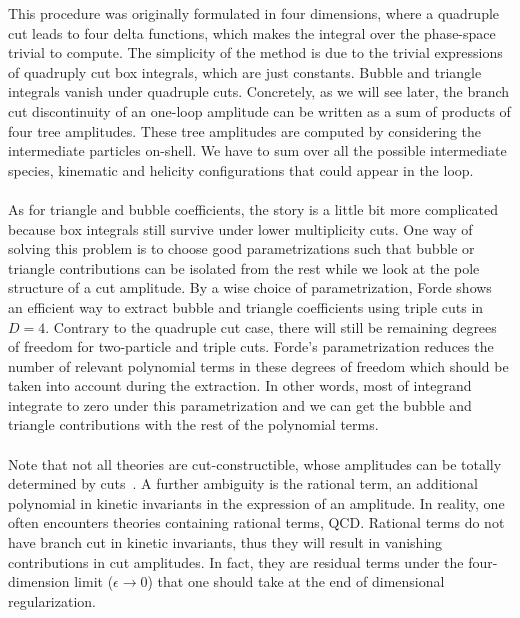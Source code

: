 This procedure was originally formulated in four dimensions, where a quadruple cut leads to four delta functions, which makes the integral over the phase-space trivial to compute. 
The simplicity of the method is due to the trivial expressions of quadruply cut box integrals, which are just constants.
Bubble and triangle integrals vanish under quadruple cuts.
Concretely, as we will see later, the branch cut discontinuity of an one-loop amplitude can be written as a sum of products of four tree amplitudes.
These tree amplitudes are computed by considering the intermediate particles on-shell.
We have to sum over all the possible intermediate species, kinematic and helicity configurations that could appear in the loop.
\\\\
As for triangle and bubble coefficients, the story is a little bit more complicated because box integrals still survive under lower multiplicity cuts.
One way of solving this problem is to choose good parametrizations such that bubble or triangle contributions can be isolated from the rest while we look at the pole structure of a cut amplitude.
By a wise choice of parametrization, Forde shows~\cite{Forde:2007mi} an efficient way to extract bubble and triangle coefficients using triple cuts in $D=4$.
Contrary to the quadruple cut case, there will still be remaining degrees of freedom for two-particle and triple cuts. 
Forde's parametrization reduces the number of relevant polynomial terms in these degrees of freedom which should be taken into account during the extraction. 
In other words, most of integrand integrate to zero under this parametrization and we can get the bubble and triangle contributions with the rest of the polynomial terms.
\\\\
Note that not all theories are cut-constructible, \ie whose amplitudes can be totally determined by cuts~\cite{Bern:1994cg}. 
A further ambiguity is the rational term, \ie an additional polynomial in kinetic invariants in the expression of an amplitude. 
In reality, one often encounters theories containing rational terms, \eg QCD.
Rational terms do not have branch cut in kinetic invariants, thus they will result in vanishing contributions in cut amplitudes.
In fact, they are residual terms under the four-dimension limit ($\epsilon\rightarrow 0$) that one should take at the end of dimensional regularization.
%
